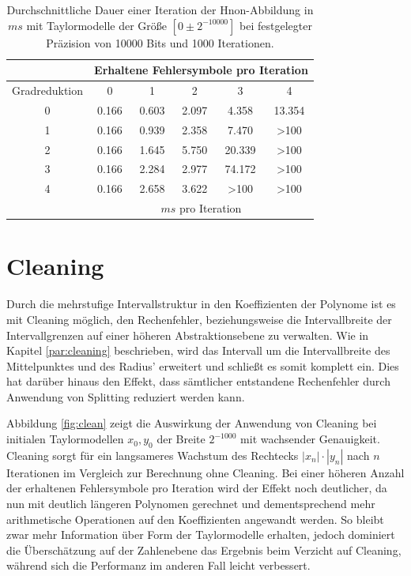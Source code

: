   
 \begin{table}[tbh]
\centering
\begin{tabular}{|c||c|c|c|c|c|}
\hline
&\multicolumn{5}{c|}{Erhaltene Fehlersymbole pro Iteration} \\
\hline
Gradreduktion & 0 & 1 &2& 3 & 4\\
\hline
0& 0.166& 0.603&    2.097&   4.358&    13.354\\
1& 0.166& 0.939&   2.358&  7.470&   >100\\
2& 0.166& 1.645&     5.750&   20.339 &    >100\\
3& 0.166& 2.284&     2.977&   74.172&    >100\\
4&0.166& 2.658&    3.622&   >100    &   >100\\
\hline 
&\multicolumn{5}{c|}{$ms$ pro Iteration} \\
\hline
\end{tabular}

\caption[Experimentelle Ergebnisse zu erhaltenen Fehlersymbolen]{Durchschnittliche Dauer einer Iteration der H\e non-Abbildung in $ms$ mit Taylormodelle der Größe $[0\pm 2^{-10000}]$ bei festgelegter Präzision von 10000 Bits und 1000 Iterationen.}
\label{tab:time}
\end{table}
 
 
 \section{Cleaning}
 Durch die mehrstufige Intervallstruktur in den Koeffizienten der Polynome ist es mit Cleaning möglich, den Rechenfehler, beziehungsweise die Intervallbreite der Intervallgrenzen auf einer höheren Abstraktionsebene zu verwalten. Wie in Kapitel \ref{par:cleaning} beschrieben, wird das Intervall um die Intervallbreite des Mittelpunktes und des Radius' erweitert und schließt es somit komplett ein. Dies hat darüber hinaus den Effekt, dass sämtlicher entstandene Rechenfehler durch Anwendung von Splitting reduziert werden kann. 
 
 
 Abbildung \ref{fig:clean} zeigt die Auswirkung der Anwendung von Cleaning bei initialen Taylormodellen $x_0, y_0$ der Breite $2^{-1000}$ mit wachsender Genauigkeit. Cleaning sorgt für ein langsameres Wachstum des Rechtecks $|x_n|\cdot|y_n|$ nach $n$ Iterationen im Vergleich zur Berechnung ohne Cleaning. Bei einer höheren Anzahl der erhaltenen Fehlersymbole pro Iteration wird der Effekt noch deutlicher, da nun mit deutlich längeren Polynomen gerechnet und dementsprechend mehr arithmetische Operationen auf den Koeffizienten angewandt werden. So bleibt zwar mehr Information über Form der Taylormodelle erhalten, jedoch dominiert die Überschätzung auf der Zahlenebene das Ergebnis beim Verzicht auf Cleaning, während sich die Performanz im anderen Fall leicht verbessert.
 

